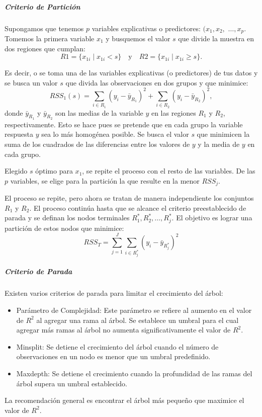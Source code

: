 \subparagraph{Criterio de Partición}
Supongamos que tenemos \(p\) variables explicativas o predictores: $(x_1, x_2,$ $\ldots, x_p$. Tomemos la primera variable \(x_1\) y busquemos el valor \(s\) que divide la muestra en dos regiones que cumplan:
\[
R1 = \{x_{1i} \mid x_{1i} < s\} \quad \text{y} \quad R2 = \{x_{1i} \mid x_{1i} \geq s\}
.\]

Es decir, o se toma una de las variables explicativas (o predictores) de tus datos y se busca un valor $s$ que divida las observaciones en dos grupos y que minimice:
\[
RSS_1(s) = \sum_{i \in R_1} (y_i - \bar{y}_{R_1})^2 + \sum_{i \in R_2} (y_i - \bar{y}_{R_2})^2,
\]
donde \(\bar{y}_{R_1}\) y \(\bar{y}_{R_2}\) son las medias de la variable \(y\) en las regiones \(R_1\) y \(R_2\), respectivamente. Esto se hace pues se pretende que en cada grupo la variable respuesta \(y\) sea lo más homogénea posible. Se busca el valor $s$ que minimicen la suma de los cuadrados de las diferencias entre los valores de $y$ y la media de $y$ en cada grupo.

Elegido \(s\) óptimo para \(x_1\), se repite el proceso con el resto de las variables. De las \(p\) variables, se elige para la partición la que resulte en la menor \(RSS_j\).

El proceso se repite, pero ahora se tratan de manera independiente los conjuntos \(R_1\) y \(R_2\). El proceso continúa hasta que se alcance el criterio preestablecido de parada y se definan los nodos terminales \(R_1^*, R_2^*, \ldots, R_j^*\). El objetivo es lograr una partición de estos nodos que minimice:
\[
RSS_T = \sum_{j=1}^{J} \sum_{i \in R_j^*} (y_i - \bar{y}_{R_j^*})^2
\]

\subparagraph{Criterio de Parada}
Existen varios criterios de parada para limitar el crecimiento del árbol:
\begin{itemize}
	\item Parámetro de Complejidad: Este parámetro se refiere al aumento en el valor de \(R^2\) al agregar una rama al árbol. Se establece un umbral para el cual agregar más ramas al árbol no aumenta significativamente el valor de \(R^2\).
	\item Minsplit: Se detiene el crecimiento del árbol cuando el número de observaciones en un nodo es menor que un umbral predefinido.
	\item Maxdepth: Se detiene el crecimiento cuando la profundidad de las ramas del árbol supera un umbral establecido.
\end{itemize}
La recomendación general es encontrar el árbol más pequeño que maximice el valor de \(R^2\).


